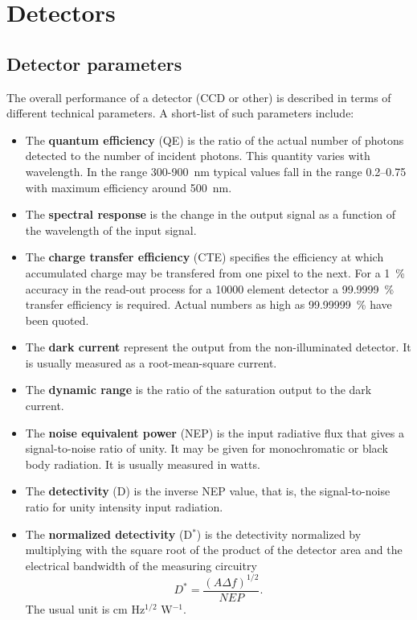 \chapter{Detectors}

\section{Detector parameters}

The overall performance of a detector (CCD or other) is described in terms of
different technical parameters. A short-list of such parameters
include:

\begin{itemize}
  \item The {\bf quantum efficiency} (QE) is the ratio of the actual
  number of photons detected to the number of incident photons. This
  quantity varies with wavelength. In the range 300-900~nm typical
  values fall in the range 0.2--0.75 with maximum efficiency around 
  500~nm.  
  \item The {\bf spectral response} is the change in the output
  signal as a function of the wavelength of the input signal.
  \item The {\bf charge transfer efficiency} (CTE) specifies the 
  efficiency at which accumulated charge may be transfered from one 
  pixel to the next. For a 1~\% accuracy in the read-out process 
  for a 10000 element detector a 99.9999~\% transfer efficiency is
  required. Actual numbers as high as 99.99999~\% have been quoted.
  \item The {\bf dark current} represent the output from the
  non-illuminated detector. It is usually measured as a
  root-mean-square current.  
  \item The {\bf dynamic range} is the ratio of the saturation output
  to the dark current.  
  \item The {\bf  noise equivalent power} (NEP) is the input radiative 
  flux that gives
  a signal-to-noise ratio of unity. It may be given for monochromatic
  or black body radiation. It is usually measured in watts.  
  \item The  {\bf detectivity} (D) is the inverse NEP value, that is, the
  signal-to-noise ratio for unity intensity input radiation.  
  \item  The {\bf normalized detectivity} (D$^*$) is the detectivity
  normalized by multiplying with the square root of the product of the
  detector area and the electrical bandwidth of the measuring
  circuitry 
  \begin{equation} 
    D^* = \frac{(A \Delta f)^{1/2}}{NEP}.
    \label{CCD.Dstar}
  \end{equation}
  The usual unit is cm Hz$^{1/2}$ W$^{-1}$.
\end{itemize}

